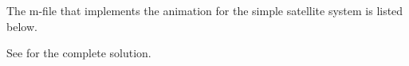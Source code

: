 
The m-file that implements the animation for the simple satellite system is listed below.


See  for the complete solution.



